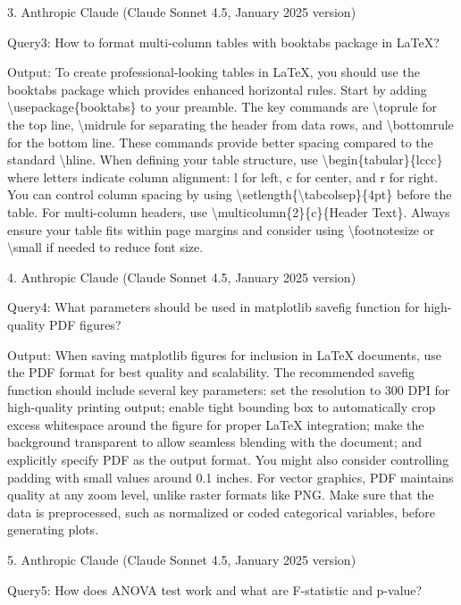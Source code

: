 \documentclass{mcmthesis}
\begin{document}
3. Anthropic Claude (Claude Sonnet 4.5, January 2025 version)

Query3: How to format multi-column tables with booktabs package in LaTeX?

Output: To create professional-looking tables in LaTeX, you should use the booktabs package which provides enhanced horizontal rules. Start by adding \textbackslash usepackage\{booktabs\} to your preamble. The key commands are \textbackslash toprule for the top line, \textbackslash midrule for separating the header from data rows, and \textbackslash bottomrule for the bottom line. These commands provide better spacing compared to the standard \textbackslash hline. When defining your table structure, use \textbackslash begin\{tabular\}\{lccc\} where letters indicate column alignment: l for left, c for center, and r for right. You can control column spacing by using \textbackslash setlength\{\textbackslash tabcolsep\}\{4pt\} before the table. For multi-column headers, use \textbackslash multicolumn\{2\}\{c\}\{Header Text\}. Always ensure your table fits within page margins and consider using \textbackslash footnotesize or \textbackslash small if needed to reduce font size.


4. Anthropic Claude (Claude Sonnet 4.5, January 2025 version)

Query4: What parameters should be used in matplotlib savefig function for high-quality PDF figures?

Output: When saving matplotlib figures for inclusion in LaTeX documents, use the PDF format for best quality and scalability. The recommended savefig function should include several key parameters: set the resolution to 300 DPI for high-quality printing output; enable tight bounding box to automatically crop excess whitespace around the figure for proper LaTeX integration; make the background transparent to allow seamless blending with the document; and explicitly specify PDF as the output format. You might also consider controlling padding with small values around 0.1 inches. For vector graphics, PDF maintains quality at any zoom level, unlike raster formats like PNG. Make sure that the data is preprocessed, such as normalized or coded categorical variables, before generating plots.

5. Anthropic Claude (Claude Sonnet 4.5, January 2025 version)

Query5: How does ANOVA test work and what are F-statistic and p-value?
\end{document}
